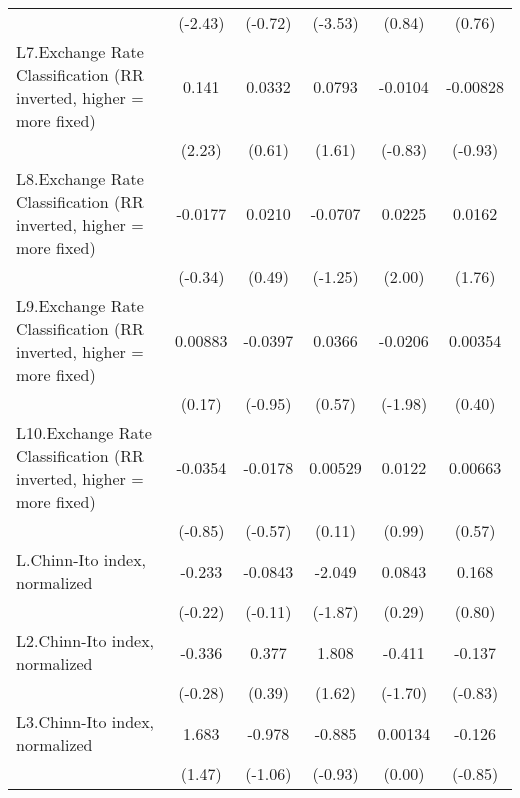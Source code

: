 {\begin{longtable}{l*{5}{c}}
                &  (-2.43)         &  (-0.72)         &  (-3.53)         &   (0.84)         &   (0.76)         \\
\addlinespace
L7.Exchange Rate Classification (RR inverted, higher = more fixed)&    0.141\sym{*}  &   0.0332         &   0.0793         &  -0.0104         & -0.00828         \\
                &   (2.23)         &   (0.61)         &   (1.61)         &  (-0.83)         &  (-0.93)         \\
\addlinespace
L8.Exchange Rate Classification (RR inverted, higher = more fixed)&  -0.0177         &   0.0210         &  -0.0707         &   0.0225\sym{*}  &   0.0162         \\
                &  (-0.34)         &   (0.49)         &  (-1.25)         &   (2.00)         &   (1.76)         \\
\addlinespace
L9.Exchange Rate Classification (RR inverted, higher = more fixed)&  0.00883         &  -0.0397         &   0.0366         &  -0.0206\sym{*}  &  0.00354         \\
                &   (0.17)         &  (-0.95)         &   (0.57)         &  (-1.98)         &   (0.40)         \\
\addlinespace
L10.Exchange Rate Classification (RR inverted, higher = more fixed)&  -0.0354         &  -0.0178         &  0.00529         &   0.0122         &  0.00663         \\
                &  (-0.85)         &  (-0.57)         &   (0.11)         &   (0.99)         &   (0.57)         \\
\addlinespace
L.Chinn-Ito index, normalized&   -0.233         &  -0.0843         &   -2.049         &   0.0843         &    0.168         \\
                &  (-0.22)         &  (-0.11)         &  (-1.87)         &   (0.29)         &   (0.80)         \\
\addlinespace
L2.Chinn-Ito index, normalized&   -0.336         &    0.377         &    1.808         &   -0.411         &   -0.137         \\
                &  (-0.28)         &   (0.39)         &   (1.62)         &  (-1.70)         &  (-0.83)         \\
\addlinespace
L3.Chinn-Ito index, normalized&    1.683         &   -0.978         &   -0.885         &  0.00134         &   -0.126         \\
                &   (1.47)         &  (-1.06)         &  (-0.93)         &   (0.00)         &  (-0.85)         \\

\end{longtable}}
